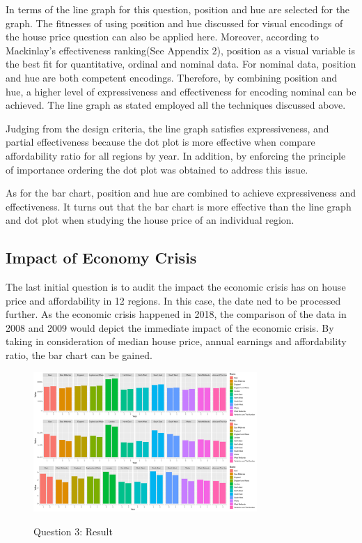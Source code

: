 \documentclass{article}
\begin{document}
In terms of the line graph for this question, position and hue are selected for the graph. The fitnesses of using position and hue discussed for visual encodings of the house price question can also be applied here. 
Moreover, according to Mackinlay's effectiveness ranking(See Appendix 2)\cite{MackinlayJock1986Atdo}, 
position as a visual variable is the best fit for quantitative, ordinal and nominal data. For nominal data, 
position and hue are both competent encodings. Therefore, by combining position and hue, a higher level of expressiveness and effectiveness for encoding nominal can be achieved. The line graph as stated employed all the techniques discussed above. 

Judging from the design criteria, the line graph satisfies expressiveness, and partial effectiveness because the dot plot is more effective when compare affordability ratio for all regions by year. In addition, by enforcing 
the principle of importance ordering the dot plot was obtained to address this issue.

As for the bar chart, position and hue are combined to achieve expressiveness and effectiveness. It turns out 
that the bar chart is more effective than the line graph and dot plot when studying the house price of an individual region.


\subsection{Impact of Economy Crisis}
The last initial question is to audit the impact the economic crisis has on house price and affordability
in 12 regions. In this case, the date ned to be processed further. As the economic crisis happened in 2018, 
the comparison of the data in 2008 and 2009 would depict the immediate impact of the economic crisis. By taking in consideration of median house price, annual earnings and affordability ratio, the bar chart can be gained.

\begin{figure}[H]
  \begin{minipage}[b]{1.0\linewidth}
    \centering
    \centerline{\includegraphics[width=8.5cm]{Q3Geom_gridbar}}
    \centerline{Question 3: Result}\medskip
  \end{minipage}
\end{figure}
\end{document}
